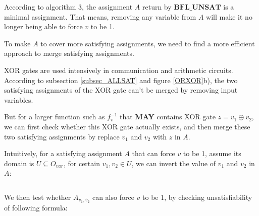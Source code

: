 \documentclass[journal]{IEEEtran}
\begin{document}


According to algorithm 3,
the assignment $A$ return by $\boldsymbol{BFL\_UNSAT}$ is a minimal assignment.
That means,
removing any variable from $A$ will make it no longer being able to force $v$ to be 1.

To make $A$ to cover more satisfying assignments,
we need to find a more efficient approach to merge satisfying assignments.

XOR gates are used intensively in communication and arithmetic circuits.
According to subsection \ref{subsec_ALLSAT} and figure \ref{ORXOR}b),
the two satisfying assignments of the XOR gate can't be merged by removing input variables.

But for a larger function such as $f^{-1}_v$ that \textbf{MAY} contains XOR gate $z=v_1 \oplus v_2$,
we can first check whether this XOR gate actually exists,
and then merge these two satisfying assignments by replace $v_1$ and $v_2$ with $z$ in $A$.

Intuitively,
for a satisfying assignment $A$ that can force $v$ to be 1,
assume its domain is $U\subseteq O_{var}$,
for certain $v_1,v_2\in U$,
we can invert the value of $v_1$ and $v_2$ in $A$:

\begin{equation}
\end{equation}

We then test whether $A_{\overline{v}_1,\overline{v}_2}$ can also force $v$ to be 1,
by checking unsatisfiability of following formula:
\end{document}
